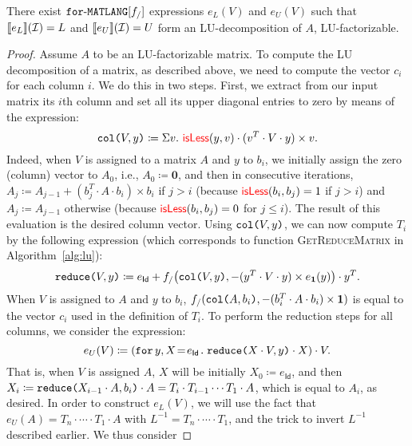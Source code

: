 \begin{proposition}\label{prop:gauss}
There exist $\langforf{f_/}$ expressions $e_L(V)$ and $e_U(V)$ such that
$\sem{e_L}{\I}=L$ and $\sem{e_U}{\I}=U$ form an LU-decomposition of $A$,
 LU-factorizable.
\end{proposition}
\begin{proof}
Assume $A$ to be an LU-factorizable matrix. To compute the LU decomposition of a matrix, as described above, we need to compute the vector $c_i$ for each column $i$. We do this in two steps. First, we extract from our input matrix its $i$th column and set all its upper diagonal entries to zero
by means of 
 the 
 expression:
$$\ccol{V}{y} \coloneqq   \Sigma v. \  \EDIT{\isless}(y,v)\cdot(v^T\cdot V \cdot y)\times v.$$
Indeed, when $V$ is assigned to a matrix $A$ and $y$ to $b_i$, we initially assign the zero (column) vector to $A_0$, i.e., 
$A_0\coloneqq  \mathbf{0}$, and then in consecutive iterations,  $A_j\coloneqq  A_{j-1}+ (b_j^T\cdot A\cdot b_i)\times b_i$ if $j>i$ (because $\EDIT{\isless}(b_i,b_j)=1$ if $j>i$) and $A_j\coloneqq A_{j-1}$ otherwise (because $\EDIT{\isless}(b_i,b_j)=0$ for $j\leq i$). The result of this evaluation is the desired column vector.
Using $\ccol{V}{y}$, we can now compute $T_i$ by the following expression (which corresponds to function \textsc{GetReduceMatrix} in Algorithm~\ref{alg:lu}):
$$\red{V}{y} \coloneqq   e_{\mathsf{Id}}+ f_/\bigl(\ccol{V}{y},-(y^T\cdot V\cdot y)\times e_{\ones}(y)\bigr)\cdot y^T.$$
When $V$ is assigned to $A$ and $y$ to $b_i$, $f_/(\ccol{A}{b_i},-(b_i^T\cdot A\cdot b_i)\times \ones)$ is equal to the vector $c_i$ used in the definition of $T_i$. To perform the reduction steps for all columns, we consider
the expression:
$$
e_{U}(V) \coloneqq    \left( \initf{e_{\mathsf{Id}}}{y}{X}{\red{X\cdot V}{y}\cdot X} \right) \cdot V.
$$
That is, when $V$ is assigned $A$, $X$ will be initially $X_0\coloneqq  e_{\mathsf{Id}}$, and then
$X_i\coloneqq  \red{X_{i-1}\cdot A}{b_i}\cdot A=T_i\cdot T_{i-1}\cdots T_1\cdot A$, which is equal to $A_i$, as desired.
%
%
In order to construct $e_L(V)$, we will use the fact that $e_U(A)=T_n\cdot\cdots\cdot T_1\cdot A$ with $L^{-1}=T_n\cdot\cdots\cdot T_1$, and the trick to invert $L^{-1}$ described earlier. We thus consider 

\end{proof}
